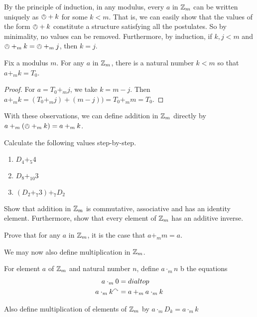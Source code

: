By the principle of induction, in any modulus, every $a$ in ${\mathbb Z}_m$ can be written uniquely as $\owedge + k$ for some $k<m$.
That is, we can easily show that the values of the form $\owedge + k$ constitute a structure satisfying all the postulates. So by minimality, no values can be removed. Furthermore, by induction, if $k,j<m$ and $\owedge +_m k = \owedge +_m j$, then $k=j$. 

\begin{lem}
	Fix a modulus $m$. 
	For any $a$ in ${\mathbb Z}_m$, there is a natural number $k<m$ so that $a +_m k = T_0$. 	
	\begin{proof}
		For $a = T_0 +_m j$, we take $k = m-j$. Then $a +_m k = (T_0 +_m j) + (m-j)) = T_0 +_m m = T_0$.
	\end{proof}
\end{lem}

With these observations, we can define addition in ${\mathbb Z}_m$ directly by $a +_m (\owedge+_m k) = a +_m k$. 

\begin{exer}
	\begin{exercise}
		\item Calculate the following values step-by-step.
		\begin{enumerate}
			\item $D_4 +_{5}4$
			\item $D_8+_{10}3$
			\item $(D_2 +_{7} 3) +_{7} D_2$
		\end{enumerate}
		\item Show that addition in ${\mathbb Z}_m$ is commutative, associative and has an identity element. Furthermore, show that every element of ${\mathbb Z}_m$ has an additive inverse.
		\item Prove that for any $a$ in ${\mathbb Z}_m$, it is the case that $a +_m m = a$.
	\end{exercise}
\end{exer}

We may now also define multiplication in ${\mathbb Z}_m$.

\begin{defn}
	For element $a$ of ${\mathbb Z}_m$ and natural number $n$, define $a\cdot_m n$ b the equations
	\begin{align*}
		a\cdot_m  0 &= dialtop\\
		a\cdot_m k^\curvearrowright &= a +_m a\cdot_m k
	\end{align*}
	
	Also define multiplication of elements of ${\mathbb Z}_{m}$ by $a\cdot_m D_k = a\cdot_m k$
\end{defn}


